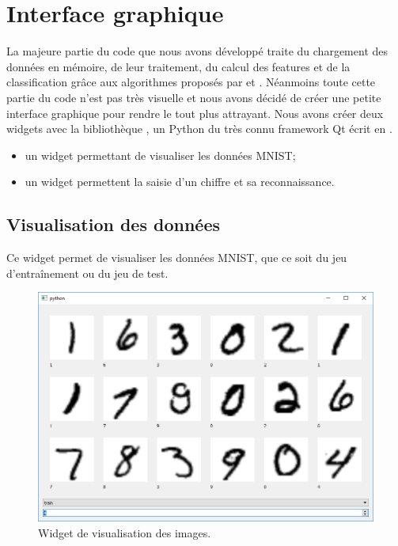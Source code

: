 
\chapter{Interface graphique}

La majeure partie du code que nous avons développé traite du chargement des données 
en mémoire, de leur traitement, du calcul des features et de la classification grâce 
aux algorithmes proposés par  et .
Néanmoins toute cette partie du code n'est pas très visuelle et nous avons 
décidé de créer une petite interface graphique pour rendre le tout plus attrayant.
Nous avons créer deux widgets avec la bibliothèque , un 
Python du très connu framework Qt écrit en \Cpp.
\begin{itemize}
  \item un widget permettant de visualiser les données MNIST;
  \item un widget permettent la saisie d'un chiffre et sa reconnaissance.
\end{itemize}


\section{Visualisation des données}

Ce widget permet de visualiser les données MNIST, que ce soit du jeu d'entraînement 
ou du jeu de test.

\begin{figure}[h]
  \centering
  \includegraphics[scale=0.66]{assets/dataset-widget}
  \caption{Widget de visualisation des images.}
\end{figure}


